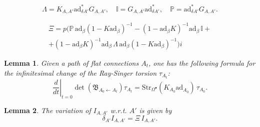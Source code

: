 \documentclass[10pt,a4paper]{amsart}
\newtheorem{lem}{Lemma}
\newcommand{\BB}{\mathfrak{B}}
\newcommand{\ad}{\mathrm{ad}}
\newcommand{\bt}{\bullet}
\newcommand{\la}{\leftarrow}
\newcommand{\mr}{\mathrm}
\begin{document}
\begin{equation}\label{Lambda, II, PP}
    \Lambda = K_{A,A'} \mr{ad}^*_{\delta A'} G_{A,A'}, \quad
    \mathbb{I} = G_{A,A'} \mr{ad}^*_{\delta A'}, \quad
    \mathbb{P} = \mr{ad}^*_{\delta A'} G_{A,A'}.
\end{equation}

\begin{multline}\label{Xi}
    \Xi=p \Big( \mathbb{P}\,\ad_\beta (1-K\ad_\beta)^{-1}-(1-\ad_\beta K)^{-1} \ad_\beta\, \mathbb{I} +\\
    +  (1-\ad_\beta K)^{-1}\ad_\beta\, \Lambda\, \ad_\beta (1-K\ad_\beta)^{-1} \Big) i
\end{multline}

\begin{lem}\label{lemma: dependence of torsion on A}
Given a path of flat connections $A_t$, one has the following formula for the infinitesimal change of the Ray-Singer torsion $\tau_{A_t}$:
    \begin{equation}\label{tau dependence on A}
        \left.\frac{d}{dt}\right|_{t=0}\det(\BB_{A_0\la A_t})\tau_{A_t}=\mr{Str}_{\Omega^\bt}(K_{A_0}\ad_{\dot{A}_0})\, \tau_{A_0}.
    \end{equation}
\end{lem}

\begin{lem}\label{lemma: dependence of I on A'}
   The variation of $I_{A,A'}$ w.r.t. $A'$ is given by
   \begin{equation}
       \delta_{A'} I_{A,A'}= \Xi\, I_{A,A'}.
   \end{equation}
\end{lem}
\end{document}
